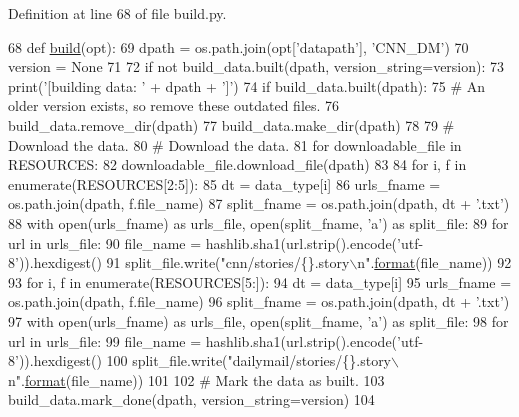Definition at line 68 of file build.\+py.


\begin{DoxyCode}
68 \textcolor{keyword}{def }\hyperlink{namespacedialog__babi__feedback_1_1build_a7a9d289f7493a5ded13c4b7f071b6184}{build}(opt):
69     dpath = os.path.join(opt[\textcolor{stringliteral}{'datapath'}], \textcolor{stringliteral}{'CNN\_DM'})
70     version = \textcolor{keywordtype}{None}
71 
72     \textcolor{keywordflow}{if} \textcolor{keywordflow}{not} build\_data.built(dpath, version\_string=version):
73         print(\textcolor{stringliteral}{'[building data: '} + dpath + \textcolor{stringliteral}{']'})
74         \textcolor{keywordflow}{if} build\_data.built(dpath):
75             \textcolor{comment}{# An older version exists, so remove these outdated files.}
76             build\_data.remove\_dir(dpath)
77         build\_data.make\_dir(dpath)
78 
79         \textcolor{comment}{# Download the data.}
80         \textcolor{comment}{# Download the data.}
81         \textcolor{keywordflow}{for} downloadable\_file \textcolor{keywordflow}{in} RESOURCES:
82             downloadable\_file.download\_file(dpath)
83 
84         \textcolor{keywordflow}{for} i, f \textcolor{keywordflow}{in} enumerate(RESOURCES[2:5]):
85             dt = data\_type[i]
86             urls\_fname = os.path.join(dpath, f.file\_name)
87             split\_fname = os.path.join(dpath, dt + \textcolor{stringliteral}{'.txt'})
88             with open(urls\_fname) \textcolor{keyword}{as} urls\_file, open(split\_fname, \textcolor{stringliteral}{'a'}) \textcolor{keyword}{as} split\_file:
89                 \textcolor{keywordflow}{for} url \textcolor{keywordflow}{in} urls\_file:
90                     file\_name = hashlib.sha1(url.strip().encode(\textcolor{stringliteral}{'utf-8'})).hexdigest()
91                     split\_file.write(\textcolor{stringliteral}{"cnn/stories/\{\}.story\(\backslash\)n"}.\hyperlink{namespaceparlai_1_1chat__service_1_1services_1_1messenger_1_1shared__utils_a32e2e2022b824fbaf80c747160b52a76}{format}(file\_name))
92 
93         \textcolor{keywordflow}{for} i, f \textcolor{keywordflow}{in} enumerate(RESOURCES[5:]):
94             dt = data\_type[i]
95             urls\_fname = os.path.join(dpath, f.file\_name)
96             split\_fname = os.path.join(dpath, dt + \textcolor{stringliteral}{'.txt'})
97             with open(urls\_fname) \textcolor{keyword}{as} urls\_file, open(split\_fname, \textcolor{stringliteral}{'a'}) \textcolor{keyword}{as} split\_file:
98                 \textcolor{keywordflow}{for} url \textcolor{keywordflow}{in} urls\_file:
99                     file\_name = hashlib.sha1(url.strip().encode(\textcolor{stringliteral}{'utf-8'})).hexdigest()
100                     split\_file.write(\textcolor{stringliteral}{"dailymail/stories/\{\}.story\(\backslash\)n"}.\hyperlink{namespaceparlai_1_1chat__service_1_1services_1_1messenger_1_1shared__utils_a32e2e2022b824fbaf80c747160b52a76}{format}(file\_name))
101 
102         \textcolor{comment}{# Mark the data as built.}
103         build\_data.mark\_done(dpath, version\_string=version)
104 \end{DoxyCode}


